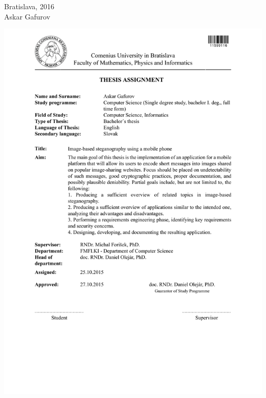 \documentclass[12pt, oneside]{book}
\def\mfrok{2016}
\def\mfautor{Askar Gafurov}
\def\mfmiesto{Bratislava, \mfrok}
\begin{document}
\noindent \mfmiesto\\
\mfautor

\eject %





\newpage 
\thispagestyle{empty}
\hspace{-2cm}\includegraphics[width=1.1\textwidth]{images/zadanie_en}
\end{document}
